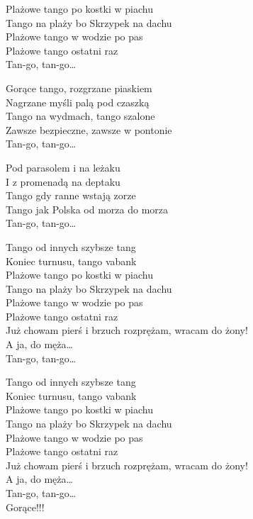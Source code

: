 \begin{text}
    Plażowe tango po kostki w piachu\\
    Tango na plaży bo Skrzypek na dachu\\
    Plażowe tango w wodzie po pas\\
    Plażowe tango ostatni raz\\
    Tan-go, tan-go…

    Gorące tango, rozgrzane piaskiem\\
    Nagrzane myśli palą pod czaszką\\
    Tango na wydmach, tango szalone\\
    Zawsze bezpieczne, zawsze w pontonie\\
    Tan-go, tan-go…

    Pod parasolem i na leżaku\\
    I z promenadą na deptaku\\
    Tango gdy ranne wstają zorze\\
    Tango jak Polska od morza do morza\\
    Tan-go, tan-go…

    Tango od innych szybsze tang\\
    Koniec turnusu, tango vabank\\
    Plażowe tango po kostki w piachu\\
    Tango na plaży bo Skrzypek na dachu\\
    Plażowe tango w wodzie po pas\\
    Plażowe tango ostatni raz\\
    Już chowam pierś i brzuch rozprężam, wracam do żony!\\
    A ja, do męża…\\
    Tan-go, tan-go…

    Tango od innych szybsze tang\\
    Koniec turnusu, tango vabank\\
    Plażowe tango po kostki w piachu\\
    Tango na plaży bo Skrzypek na dachu\\
    Plażowe tango w wodzie po pas\\
    Plażowe tango ostatni raz\\
    Już chowam pierś i brzuch rozprężam, wracam do żony!\\
    A ja, do męża…\\
    Tan-go, tan-go…\\
    Gorące!!!
\end{text}
\begin{chord}

\end{chord}